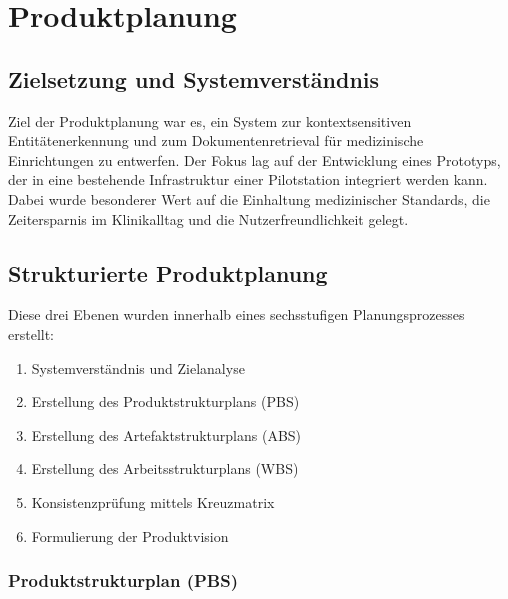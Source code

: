 {\let\clearpage\relax
\chapter{Produktplanung}}
\label{sec:produktplanung}

\section{Zielsetzung und Systemverständnis}
Ziel der Produktplanung war es, ein System zur kontextsensitiven Entitätenerkennung und zum Dokumentenretrieval für medizinische Einrichtungen zu entwerfen. Der Fokus lag auf der Entwicklung eines Prototyps, der in eine bestehende Infrastruktur einer Pilotstation integriert werden kann. Dabei wurde besonderer Wert auf die Einhaltung medizinischer Standards, die Zeitersparnis im Klinikalltag und die Nutzerfreundlichkeit gelegt.

\section{Strukturierte Produktplanung}
Diese drei Ebenen wurden innerhalb eines sechsstufigen Planungsprozesses erstellt:
\vspace{-\topsep}
\begin{enumerate}
	\item Systemverständnis und Zielanalyse
	\item Erstellung des Produktstrukturplans (PBS)
	\item Erstellung des Artefaktstrukturplans (ABS)
	\item Erstellung des Arbeitsstrukturplans (WBS)
	\item Konsistenzprüfung mittels Kreuzmatrix
	\item Formulierung der Produktvision
\end{enumerate}

\subsection{Produktstrukturplan (PBS)}


